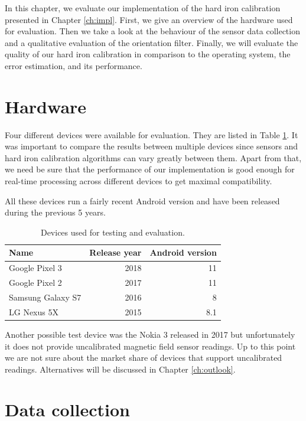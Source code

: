 In this chapter, we evaluate our implementation of the hard iron calibration presented in Chapter \ref{ch:impl}. First, we give an overview of the hardware used for evaluation. Then we take a look at the behaviour of the sensor data collection and a qualitative evaluation of the orientation filter. Finally, we will evaluate the quality of our hard iron calibration in comparison to the operating system, the error estimation, and its performance.

\section{Hardware}

Four different devices were available for evaluation. They are listed in Table \ref{tbl:hardware}. It was important to compare the results between multiple devices since sensors and hard iron calibration algorithms can vary greatly between them. Apart from that, we need be sure that the performance of our implementation is good enough for real-time processing across different devices to get maximal compatibility.

All these devices run a fairly recent Android version and have been released during the previous 5 years.

\begin{table}[h]
    \centering
    \begin{tabular}{ | l | r | r | }
    \hline
    \textbf{Name}     & \textbf{Release year} & \textbf{Android version} \\ \hline
    Google Pixel 3    & 2018 & 11 \\ \hline
    Google Pixel 2    & 2017 & 11 \\ \hline
    Samsung Galaxy S7 & 2016 & 8 \\ \hline
    LG Nexus 5X       & 2015 & 8.1 \\ \hline
    \end{tabular}
    \caption{Devices used for testing and evaluation.}
    \label{tbl:hardware}
\end{table}

Another possible test device was the Nokia 3 released in 2017 but unfortunately it does not provide uncalibrated magnetic field sensor readings. Up to this point we are not sure about the market share of devices that support uncalibrated readings. Alternatives will be discussed in Chapter \ref{ch:outlook}.

\section{Data collection}
\label{sec:eval_sensor}

